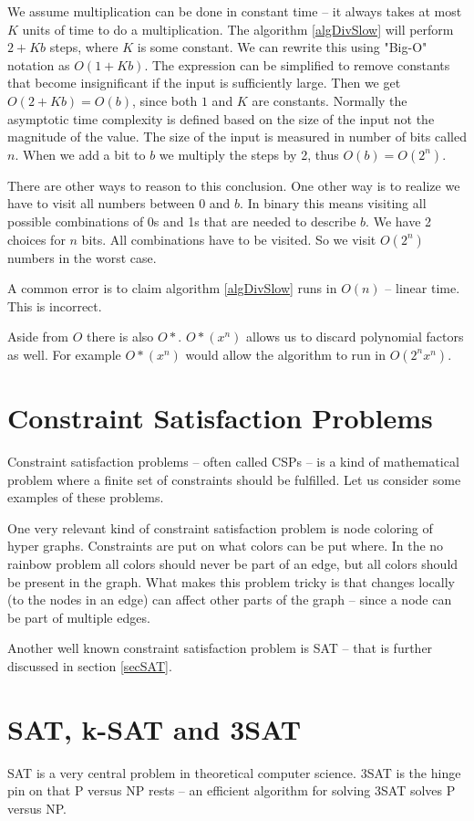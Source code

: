\documentclass[msc,lith,english]{liuthesis}
\begin{document}
We assume multiplication can be done in constant time -- it always takes at most $K$ units of time to do a multiplication.
The algorithm \ref{algDivSlow} will perform $ 2 + Kb $ steps, where $K$ is some
constant. We can rewrite this using "Big-O" notation as $O(1 + Kb)$. The expression can be
simplified to remove constants that become insignificant if the
input is sufficiently large. Then we get $O(2 + Kb) = O(b)$, since both $1$ and $K$ are constants. 
Normally the asymptotic time complexity is defined based on the size of the input not the magnitude of the value.
The size of the input is measured in number of bits called $n$. When we add a bit to $b$ we multiply the steps by 2,
thus $O(b) = O(2^n)$.

There are other ways to reason to this conclusion.
One other way is to realize we have to visit all numbers between $0$ and $b$.
In binary this means visiting all possible combinations of 0s and 1s that are needed to describe $b$.
We have 2 choices for $n$ bits. All combinations have to be visited. So we visit $O(2^n)$ numbers in the worst case.
\cite[Chapter 3]{sourceAlgoBook}

A common error is to claim algorithm \ref{algDivSlow} runs in $O(n)$ -- linear time. This is incorrect.

Aside from $O$ there is also $O*$. $O*(x^n)$ allows us to discard polynomial factors as well. For example $O*(x^n)$ would allow the algorithm to run in $O(2^nx^n)$.

\section{Constraint Satisfaction Problems}
Constraint satisfaction problems -- often called CSPs -- is a kind of mathematical problem where a finite set of constraints should be fulfilled. Let us consider some examples of these problems.

One very relevant kind of constraint satisfaction problem is node coloring of hyper graphs.
Constraints are put on what colors can be put where. In the no rainbow problem all colors should never be part of an edge, but all colors should be present in the graph. What makes this problem tricky is that changes locally (to the nodes in an edge) can affect other parts of the graph -- since a node can be part of multiple edges.

Another well known constraint satisfaction problem is SAT -- that is further discussed in section \ref{secSAT}.

\section{SAT, k-SAT and 3SAT}
SAT is a very central problem in theoretical computer science. 3SAT is the
hinge pin on that P versus NP rests -- an efficient algorithm for solving 3SAT
solves P versus NP.
\end{document}
